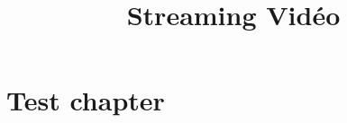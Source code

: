 \documentclass[11pt, titlepage, openright]{book}
\title{Streaming Vid\'eo}
\begin{document}
\maketitle
\chapter{Test chapter}
\lipsum
\lipsum
\end{document}
